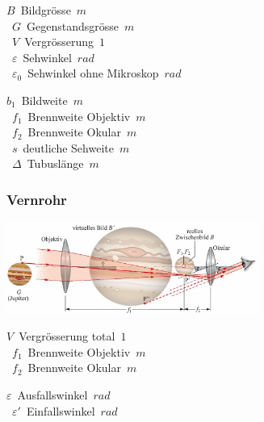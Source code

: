 \begin{center}
	\begin{minipage}{0.3\textwidth}
		\unit{$ B $}{Bildgrösse}{$m$} \\
		\unit{$ G $}{Gegenstandsgrösse}{$m$} \\
		\unit{$ V $}{Vergrösserung}{$1$} \\
		\unit{$ \varepsilon $}{Sehwinkel}{$rad$} \\
		\unit{$ \varepsilon_0 $}{Sehwinkel ohne Mikroskop}{$rad$} \\
	\end{minipage}%
	\begin{minipage}{0.3\textwidth}
		\unit{$ b_1 $}{Bildweite}{$m$} \\
		\unit{$ f_1 $}{Brennweite Objektiv}{$m$} \\
		\unit{$ f_2 $}{Brennweite Okular}{$m$} \\
		\unit{$ s $}{deutliche Sehweite}{$m$} \\
		\unit{$ \Delta $}{Tubuslänge}{$m$} \\
	\end{minipage}
\end{center}


\subsubsection{Vernrohr}

\begin{center}
	\begin{minipage}{0.2\textwidth}
	\end{minipage}%
	\begin{minipage}{0.3\textwidth}
		\includegraphics[height=3cm,keepaspectratio=true]{Images/vernrohr.png}
	\end{minipage}
\end{center}

\begin{center}
	\begin{minipage}{0.3\textwidth}
		\unit{$ V $}{Vergrösserung total}{$1$} \\
		\unit{$ f_1 $}{Brennweite Objektiv}{$m$} \\
		\unit{$ f_2 $}{Brennweite Okular}{$m$} \\
	\end{minipage}%
	\begin{minipage}{0.3\textwidth}
		\unit{$ \varepsilon $}{Ausfallswinkel}{$rad$} \\
		\unit{$ \varepsilon' $}{Einfallswinkel}{$rad$} \\
	\end{minipage}
\end{center}

